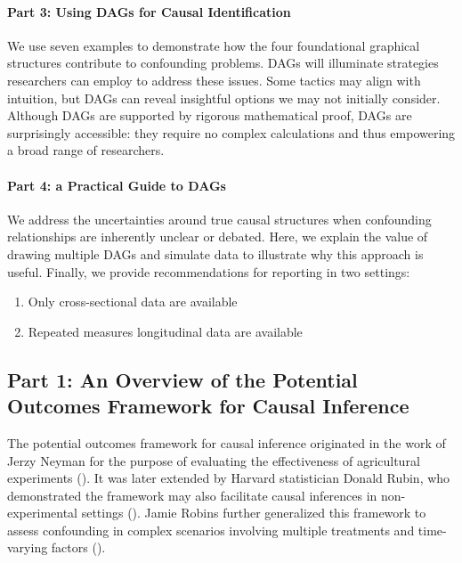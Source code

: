\documentclass[
  singlecolumn]{article}
\let\oldparagraph\paragraph
\renewcommand{\paragraph}[1]{\oldparagraph{#1}\mbox{}}
\providecommand{\tightlist}{%
  \setlength{\itemsep}{0pt}\setlength{\parskip}{0pt}}\usepackage{longtable,booktabs,array}
\begin{document}
\paragraph{Part 3: Using DAGs for Causal
Identification}\label{part-3-using-dags-for-causal-identification}

We use seven examples to demonstrate how the four foundational graphical
structures contribute to confounding problems. DAGs will illuminate
strategies researchers can employ to address these issues. Some tactics
may align with intuition, but DAGs can reveal insightful options we may
not initially consider. Although DAGs are supported by rigorous
mathematical proof, DAGs are surprisingly accessible: they require no
complex calculations and thus empowering a broad range of researchers.

\paragraph{Part 4: a Practical Guide to
DAGs}\label{part-4-a-practical-guide-to-dags}

We address the uncertainties around true causal structures when
confounding relationships are inherently unclear or debated. Here, we
explain the value of drawing multiple DAGs and simulate data to
illustrate why this approach is useful. Finally, we provide
recommendations for reporting in two settings:

\begin{enumerate}
\def\labelenumi{(\roman{enumi})}
\tightlist
\item
  Only cross-sectional data are available
\item
  Repeated measures longitudinal data are available
\end{enumerate}

\subsection{Part 1: An Overview of the Potential Outcomes Framework for
Causal
Inference}\label{part-1-an-overview-of-the-potential-outcomes-framework-for-causal-inference}

The potential outcomes framework for causal inference originated in the
work of Jerzy Neyman for the purpose of evaluating the effectiveness of
agricultural experiments (). It
was later extended by Harvard statistician Donald Rubin, who
demonstrated the framework may also facilitate causal inferences in
non-experimental settings (). Jamie
Robins further generalized this framework to assess confounding in
complex scenarios involving multiple treatments and time-varying factors
().
\end{document}
